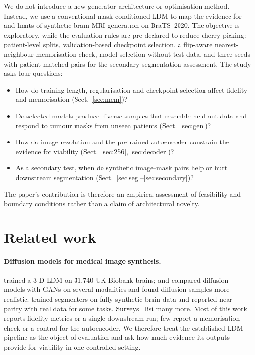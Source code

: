 \documentclass[10pt,a4paper]{article}
\begin{document}
We do not introduce a new generator architecture or optimisation method. Instead, we use a conventional mask-conditioned LDM to map the evidence for and limits of synthetic brain MRI generation on BraTS~2020. The objective is exploratory, while the evaluation rules are pre-declared to reduce cherry-picking: patient-level splits, validation-based checkpoint selection, a flip-aware nearest-neighbour memorisation check, model selection without test data, and three seeds with patient-matched pairs for the secondary segmentation assessment. The study asks four questions:
\begin{itemize}\setlength\itemsep{1pt}
  \item How do training length, regularisation and checkpoint selection affect fidelity and memorisation (Sect.~\ref{sec:mem})?
  \item Do selected models produce diverse samples that resemble held-out data and respond to tumour masks from unseen patients (Sect.~\ref{sec:gen})?
  \item How do image resolution and the pretrained autoencoder constrain the evidence for viability (Sect.~\ref{sec:256}, \ref{sec:decoder})?
  \item As a secondary test, when do synthetic image--mask pairs help or hurt downstream segmentation (Sect.~\ref{sec:seg}--\ref{sec:secondary})?
\end{itemize}
The paper's contribution is therefore an empirical assessment of feasibility and boundary conditions rather than a claim of architectural novelty.

\section{Related work}
\paragraph{Diffusion models for medical image synthesis.} \citet{pinaya2022brain} trained a 3-D LDM on 31,740 UK Biobank brains; \citet{khader2023ddpm3d} and \citet{mullerfranzes2023medfusion} compared diffusion models with GANs on several modalities and found diffusion samples more realistic. \citet{fernandez2022brainspade} trained segmenters on fully synthetic brain data and reported near-parity with real data for some tasks. Surveys~\citep{kazerouni2023survey,chen2021synthetic} list many more. Most of this work reports fidelity metrics or a single downstream run; few report a memorisation check or a control for the autoencoder. We therefore treat the established LDM pipeline as the object of evaluation and ask how much evidence its outputs provide for viability in one controlled setting.
\end{document}
